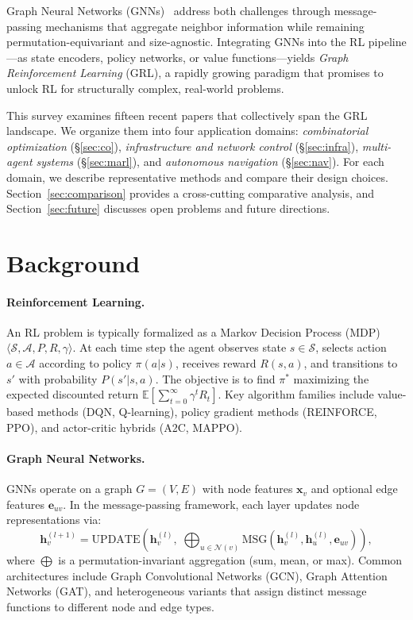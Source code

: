 \documentclass{article}
\begin{document}
Graph Neural Networks (GNNs)~\cite{mudigonda2022grl_survey} address both challenges through message-passing mechanisms that aggregate neighbor information while remaining permutation-equivariant and size-agnostic. Integrating GNNs into the RL pipeline---as state encoders, policy networks, or value functions---yields \emph{Graph Reinforcement Learning} (GRL), a rapidly growing paradigm that promises to unlock RL for structurally complex, real-world problems.

This survey examines fifteen recent papers that collectively span the GRL landscape. We organize them into four application domains: \emph{combinatorial optimization} (\S\ref{sec:co}), \emph{infrastructure and network control} (\S\ref{sec:infra}), \emph{multi-agent systems} (\S\ref{sec:marl}), and \emph{autonomous navigation} (\S\ref{sec:nav}). For each domain, we describe representative methods and compare their design choices. Section~\ref{sec:comparison} provides a cross-cutting comparative analysis, and Section~\ref{sec:future} discusses open problems and future directions.

\section{Background}\label{sec:bg}

\paragraph{Reinforcement Learning.}
An RL problem is typically formalized as a Markov Decision Process (MDP) $\langle \mathcal{S}, \mathcal{A}, P, R, \gamma \rangle$. At each time step the agent observes state $s \in \mathcal{S}$, selects action $a \in \mathcal{A}$ according to policy $\pi(a|s)$, receives reward $R(s,a)$, and transitions to $s'$ with probability $P(s'|s,a)$. The objective is to find $\pi^*$ maximizing the expected discounted return $\mathbb{E}[\sum_{t=0}^{\infty}\gamma^t R_t]$. Key algorithm families include value-based methods (DQN, Q-learning), policy gradient methods (REINFORCE, PPO), and actor-critic hybrids (A2C, MAPPO).

\paragraph{Graph Neural Networks.}
GNNs operate on a graph $G=(V,E)$ with node features $\mathbf{x}_v$ and optional edge features $\mathbf{e}_{uv}$. In the message-passing framework, each layer updates node representations via:
\begin{equation}
\mathbf{h}_v^{(l+1)} = \text{UPDATE}\!\left(\mathbf{h}_v^{(l)},\; \bigoplus_{u \in \mathcal{N}(v)} \text{MSG}\!\left(\mathbf{h}_v^{(l)}, \mathbf{h}_u^{(l)}, \mathbf{e}_{uv}\right)\right),
\end{equation}
where $\bigoplus$ is a permutation-invariant aggregation (sum, mean, or max). Common architectures include Graph Convolutional Networks (GCN), Graph Attention Networks (GAT), and heterogeneous variants that assign distinct message functions to different node and edge types.
\end{document}
